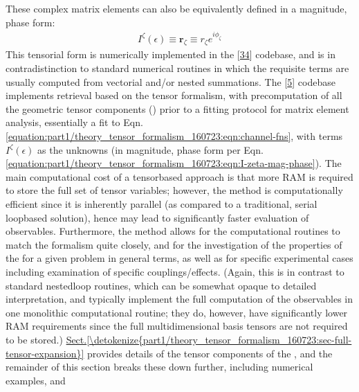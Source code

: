\documentclass[letterpaper,table,10pt,english]{jupyterBook}
\begin{document}
\sphinxAtStartPar
These complex matrix elements can also be equivalently defined in a magnitude, phase
form:
\begin{equation}\label{equation:part1/theory_tensor_formalism_160723:eqn:I-zeta-mag-phase}
\begin{split}I^{\zeta}(\epsilon)\equiv\mathbf{r}_{\zeta}\equiv r_{\zeta}e^{i\phi_{\zeta}}\end{split}
\end{equation}
\sphinxAtStartPar
This tensorial form is numerically implemented in the  {[}\hyperlink{cite.backmatter/bibliography:id608}{34}{]} codebase, and is in contradistinction to standard numerical routines in which the requisite terms are usually computed from vectorial and/or nested summations. The  {[}\hyperlink{cite.backmatter/bibliography:id682}{5}{]} codebase implements {\hyperref[\detokenize{backmatter/glossary:term-radial-matrix-elements}]{}} retrieval based on the tensor formalism, with pre\sphinxhyphen{}computation of all the geometric tensor components ({\hyperref[\detokenize{backmatter/glossary:term-channel-functions}]{}}) prior to a fitting protocol for matrix element analysis, essentially a fit to Eqn. \eqref{equation:part1/theory_tensor_formalism_160723:eqn:channel-fns}, with terms \(I^{\zeta}(\epsilon)\) as the unknowns (in magnitude, phase form per Eqn. \eqref{equation:part1/theory_tensor_formalism_160723:eqn:I-zeta-mag-phase}). The main computational cost of a tensor\sphinxhyphen{}based approach is that more RAM is required to store the full set of tensor variables; however, the method is computationally efficient since it is inherently parallel (as compared to a traditional, serial loop\sphinxhyphen{}based solution), hence may lead to significantly faster evaluation of observables. Furthermore, the method allows for the computational routines to match the formalism quite closely, and for the investigation of the properties of the {\hyperref[\detokenize{backmatter/glossary:term-channel-functions}]{}} for a given problem in general terms, as well as for specific experimental cases including examination of specific couplings/effects. (Again, this is in contrast to standard nested\sphinxhyphen{}loop routines, which can be somewhat opaque to detailed interpretation, and typically implement the full computation of the observables in one monolithic computational routine; they do, however, have significantly lower RAM requirements since the full multi\sphinxhyphen{}dimensional basis tensors are not required to be stored.) \hyperref[\detokenize{part1/theory_tensor_formalism_160723:sec-full-tensor-expansion}]{Sect.\@ \ref{\detokenize{part1/theory_tensor_formalism_160723:sec-full-tensor-expansion}}} provides details of the tensor components of the {\hyperref[\detokenize{backmatter/glossary:term-channel-functions}]{}}, and the remainder of this section breaks these down further, including numerical examples, and 
\end{document}
